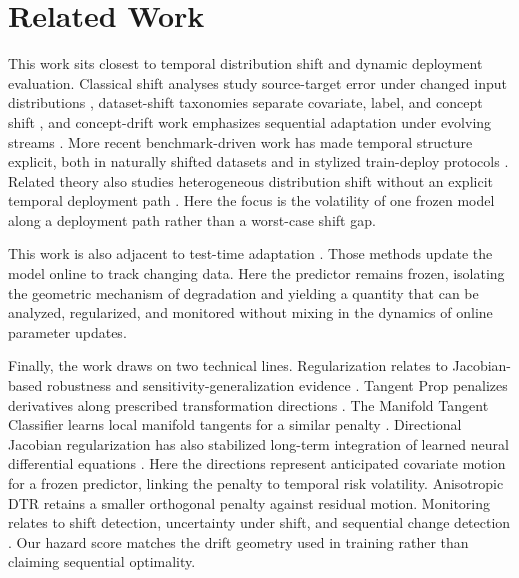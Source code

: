 \documentclass[conference]{IEEEtran}
\begin{document}
\section{Related Work}
This work sits closest to temporal distribution shift and dynamic deployment evaluation. Classical shift analyses study source-target error under changed input distributions \cite{ben-david-shift}, dataset-shift taxonomies separate covariate, label, and concept shift \cite{moreno-shift}, and concept-drift work emphasizes sequential adaptation under evolving streams \cite{gama-drift}. More recent benchmark-driven work has made temporal structure explicit, both in naturally shifted datasets and in stylized train-deploy protocols \cite{koh-wilds,yao-wildtime,han-temporal}. Related theory also studies heterogeneous distribution shift without an explicit temporal deployment path \cite{simchowitz-shift}. Here the focus is the volatility of one frozen model along a deployment path rather than a worst-case shift gap.

This work is also adjacent to test-time adaptation \cite{sun-ttt,wang-tent,gui-atta}. Those methods update the model online to track changing data. Here the predictor remains frozen, isolating the geometric mechanism of degradation and yielding a quantity that can be analyzed, regularized, and monitored without mixing in the dynamics of online parameter updates.

Finally, the work draws on two technical lines. Regularization relates to Jacobian-based robustness \cite{sokolic-jacobian,kim-jacobian} and sensitivity-generalization evidence \cite{novak-sensitivity}. Tangent Prop penalizes derivatives along prescribed transformation directions \cite{simard-tangentprop}. The Manifold Tangent Classifier learns local manifold tangents for a similar penalty \cite{rifai-manifold-tangent}. Directional Jacobian regularization has also stabilized long-term integration of learned neural differential equations \cite{janvier-neural-de}. Here the directions represent anticipated covariate motion for a frozen predictor, linking the penalty to temporal risk volatility. Anisotropic DTR retains a smaller orthogonal penalty against residual motion. Monitoring relates to shift detection, uncertainty under shift, and sequential change detection \cite{rabanser-shift,ovadia-shift,wu-rscusum,cao-xie-allerton2015,xie-lowrank-allerton2016,krishnamurthy-allerton2022,cooper-allerton2024}. Our hazard score matches the drift geometry used in training rather than claiming sequential optimality.
\end{document}
